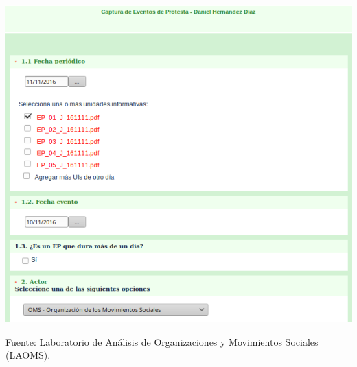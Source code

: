 \documentclass[letterpaper, 11pt]{book}
\theoremstyle{definition}
\theoremstyle{remark}
\begin{document}
\hspace{-1.5em}\begin{minipage}{\linewidth}
\centering
{} \label{2.11_plataformaLAOMS}
\includegraphics[scale=0.68]{img/2.11_plataformaLAOMS.png}
\par\bigskip
\small Fuente: Laboratorio de Análisis  de Organizaciones y Movimientos Sociales (LAOMS).
\end{minipage}\bigskip
\end{document}
